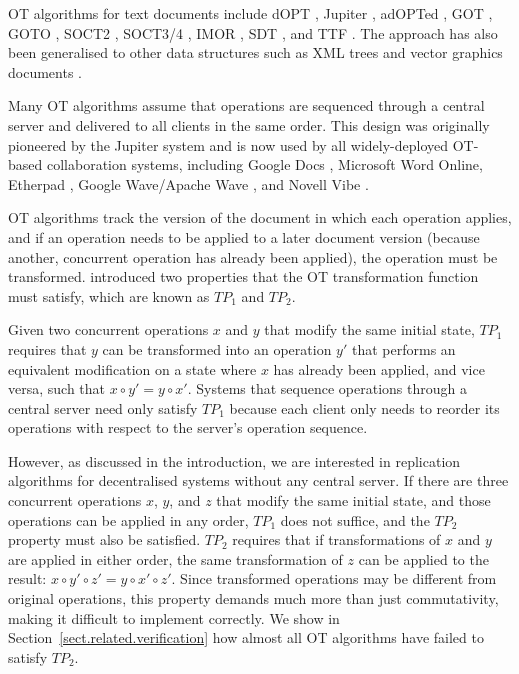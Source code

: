 OT algorithms for text documents include dOPT \cite{Ellis:1989ue}, Jupiter \cite{Nichols:1995fd}, adOPTed \cite{Ressel:1996wx}, GOT \cite{Sun:1998un}, GOTO \cite{Sun:1998vf}, SOCT2 \cite{Suleiman:1997gl,Suleiman:1998eu}, SOCT3/4 \cite{Vidot:2000ch}, IMOR \cite{Imine:2003ks}, SDT \cite{Li:2004er,Li:2008hw}, and TTF \cite{Oster:2006tr}.
The approach has also been generalised to other data structures such as XML trees \cite{Ignat:2003jy,Davis:2002iv,Jungnickel:2015ua} and vector graphics documents \cite{Sun:2002jb}.

Many OT algorithms assume that operations are sequenced through a central server and delivered to all clients in the same order.
This design was originally pioneered by the Jupiter system \cite{Nichols:1995fd} and is now used by all widely-deployed OT-based collaboration systems, including Google Docs \cite{DayRichter:2010tt}, Microsoft Word Online, Etherpad \cite{Etherpad:2011um}, Google Wave/Apache Wave \cite{Wang:2015vo}, and Novell Vibe \cite{Spiewak:2010vw}.

OT algorithms track the version of the document in which each operation applies, and if an operation needs to be applied to a later document version (because another, concurrent operation has already been applied), the operation must be transformed.
\citet{Ressel:1996wx} introduced two properties that the OT transformation function must satisfy, which are known as $\mathit{TP}_1$ and $\mathit{TP}_2$.

Given two concurrent operations $x$ and $y$ that modify the same initial state, $\mathit{TP}_1$ requires that $y$ can be transformed into an operation $y'$ that performs an equivalent modification on a state where $x$ has already been applied, and vice versa, such that $x \circ y' = y \circ x'$.
Systems that sequence operations through a central server need only satisfy $\mathit{TP}_1$ because each client only needs to reorder its operations with respect to the server's operation sequence.

However, as discussed in the introduction, we are interested in replication algorithms for decentralised systems without any central server.
If there are three concurrent operations $x$, $y$, and $z$ that modify the same initial state, and those operations can be applied in any order, $\mathit{TP}_1$ does not suffice, and the $\mathit{TP}_2$ property must also be satisfied.
$\mathit{TP}_2$ requires that if transformations of $x$ and $y$ are applied in either order, the same transformation of $z$ can be applied to the result: $x \circ y' \circ z' = y \circ x' \circ z'$.
Since transformed operations may be different from original operations, this property demands much more than just commutativity, making it difficult to implement correctly.
We show in Section~\ref{sect.related.verification} how almost all OT algorithms have failed to satisfy $\mathit{TP}_2$.

